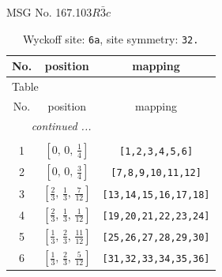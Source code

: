 \documentclass[fleqn,8pt]{jsarticle}
\begin{document}
\setcounter{MaxMatrixCols}{32}

\renewcommand{\tablename}{Table~}
\renewcommand{\figurename}{Figure~}
\begin{center}
\LARGE
MSG No. 167.103\quad$R\bar{3}c$
\end{center}
\renewcommand{\arraystretch}{1.2}
\begin{longtable}{ccc}
\caption{Wyckoff site: {\tt 6a}, site symmetry: {\tt 32.}}
 \\
 \hline \hline
No. & position & mapping \\ \hline \endfirsthead

\multicolumn{2}{l}{\tablename\ \thetable{}} \\
 \hline \hline
No. & position & mapping \\ \hline \endhead

 \hline \hline
\multicolumn{2}{r}{\footnotesize\it continued ...} \\ \endfoot

 \hline \hline
\multicolumn{2}{r}{} \\ \endlastfoot

1 & $\left[ 0,\, 0,\, \frac{1}{4} \right]$ & {\tt [1,2,3,4,5,6]} \\ \hline
2 & $\left[ 0,\, 0,\, \frac{3}{4} \right]$ & {\tt [7,8,9,10,11,12]} \\ \hline
3 & $\left[ \frac{2}{3},\, \frac{1}{3},\, \frac{7}{12} \right]$ & {\tt [13,14,15,16,17,18]} \\ \hline
4 & $\left[ \frac{2}{3},\, \frac{1}{3},\, \frac{1}{12} \right]$ & {\tt [19,20,21,22,23,24]} \\ \hline
5 & $\left[ \frac{1}{3},\, \frac{2}{3},\, \frac{11}{12} \right]$ & {\tt [25,26,27,28,29,30]} \\ \hline
6 & $\left[ \frac{1}{3},\, \frac{2}{3},\, \frac{5}{12} \right]$ & {\tt [31,32,33,34,35,36]} \\
\end{longtable}
\renewcommand{\arraystretch}{1.2}
\end{document}
